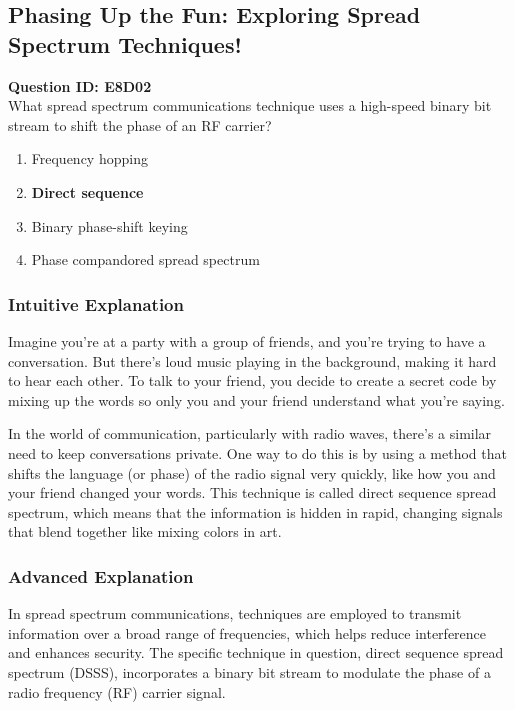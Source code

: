 \subsection{Phasing Up the Fun: Exploring Spread Spectrum Techniques!}

\begin{tcolorbox}
\textbf{Question ID: E8D02} \\[0.5em]
What spread spectrum communications technique uses a high-speed binary bit stream to shift the phase of an RF carrier? \\[0.5em]
\begin{enumerate}[label=\Alph*.]
    \item Frequency hopping
    \item \textbf{Direct sequence}
    \item Binary phase-shift keying
    \item Phase compandored spread spectrum
\end{enumerate}
\end{tcolorbox}

\subsubsection{Intuitive Explanation}
Imagine you're at a party with a group of friends, and you're trying to have a conversation. But there's loud music playing in the background, making it hard to hear each other. To talk to your friend, you decide to create a secret code by mixing up the words so only you and your friend understand what you're saying. 

In the world of communication, particularly with radio waves, there's a similar need to keep conversations private. One way to do this is by using a method that shifts the language (or phase) of the radio signal very quickly, like how you and your friend changed your words. This technique is called direct sequence spread spectrum, which means that the information is hidden in rapid, changing signals that blend together like mixing colors in art.

\subsubsection{Advanced Explanation}
In spread spectrum communications, techniques are employed to transmit information over a broad range of frequencies, which helps reduce interference and enhances security. The specific technique in question, direct sequence spread spectrum (DSSS), incorporates a binary bit stream to modulate the phase of a radio frequency (RF) carrier signal.

